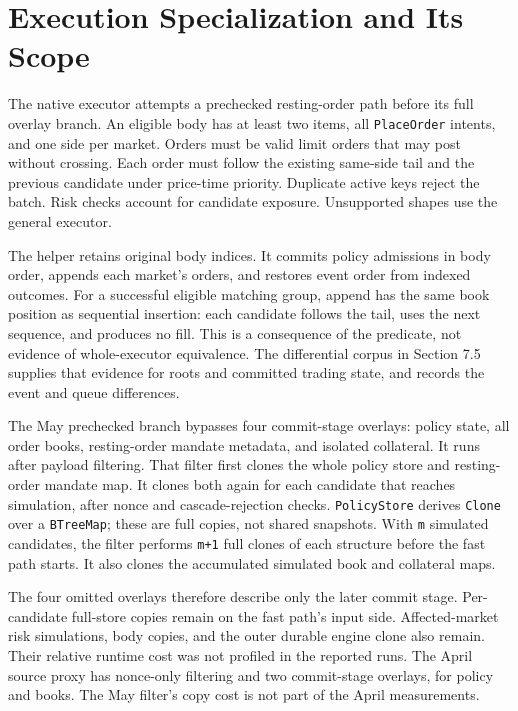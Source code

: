 \documentclass[11pt]{article}
\begin{document}
\section{Execution Specialization and Its Scope}
The native executor attempts a prechecked resting-order path before its full overlay branch. An eligible body has at least two items, all \texttt{PlaceOrder} intents, and one side per market. Orders must be valid limit orders that may post without crossing. Each order must follow the existing same-side tail and the previous candidate under price-time priority. Duplicate active keys reject the batch. Risk checks account for candidate exposure. Unsupported shapes use the general executor. \cite{R27}

The helper retains original body indices. It commits policy admissions in body order, appends each market's orders, and restores event order from indexed outcomes. For a successful eligible matching group, append has the same book position as sequential insertion: each candidate follows the tail, uses the next sequence, and produces no fill. This is a consequence of the predicate, not evidence of whole-executor equivalence. The differential corpus in Section 7.5 supplies that evidence for roots and committed trading state, and records the event and queue differences. \cite{R30}

The May prechecked branch bypasses four commit-stage overlays: policy state, all order books, resting-order mandate metadata, and isolated collateral. It runs after payload filtering. That filter first clones the whole policy store and resting-order mandate map. It clones both again for each candidate that reaches simulation, after nonce and cascade-rejection checks. \texttt{PolicyStore} derives \texttt{Clone} over a \texttt{BTreeMap}; these are full copies, not shared snapshots. With \texttt{m} simulated candidates, the filter performs \texttt{m+1} full clones of each structure before the fast path starts. It also clones the accumulated simulated book and collateral maps. \cite{R29}

The four omitted overlays therefore describe only the later commit stage. Per-candidate full-store copies remain on the fast path's input side. Affected-market risk simulations, body copies, and the outer durable engine clone also remain. Their relative runtime cost was not profiled in the reported runs. The April source proxy has nonce-only filtering and two commit-stage overlays, for policy and books. The May filter's copy cost is not part of the April measurements. \cite{R27,R29}
\end{document}
